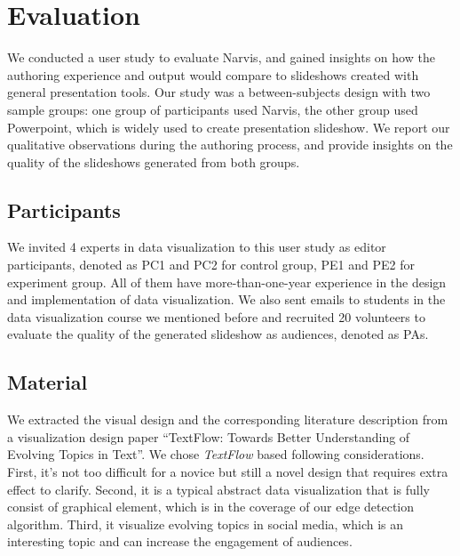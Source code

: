 \section{Evaluation}

We conducted a user study to evaluate Narvis, and gained insights on how the authoring experience and output would compare to slideshows created with general presentation tools. Our study was a between-subjects design with two sample groups: one group of participants used Narvis, the other group used Powerpoint, which is widely used to create presentation slideshow. 
We report our qualitative observations during the authoring process, and provide insights on the quality of the slideshows generated from both groups.

\subsection{Participants}
We invited 4 experts in data visualization to this user study as editor participants, denoted as PC1 and PC2 for control group, PE1 and PE2 for experiment group. All of them have more-than-one-year experience in the design and implementation of data visualization. We also sent emails to students in the data visualization course we mentioned before and recruited 20 volunteers to evaluate the quality of the generated slideshow as audiences, denoted as PAs. 
\subsection{Material}
We extracted the visual design and the corresponding literature description from  a visualization design paper ``TextFlow: Towards Better Understanding of Evolving Topics in Text''\cite{cui_textflow:_2011}.
We chose \textit{TextFlow} based following considerations. First, it's not too difficult for a novice but still a novel design that requires extra effect to clarify.
Second, it is a typical abstract data visualization that is fully consist of graphical element, which is in the coverage of our edge detection algorithm. 
Third, it visualize evolving topics in social media, which is an interesting topic and can increase the engagement of audiences. 


